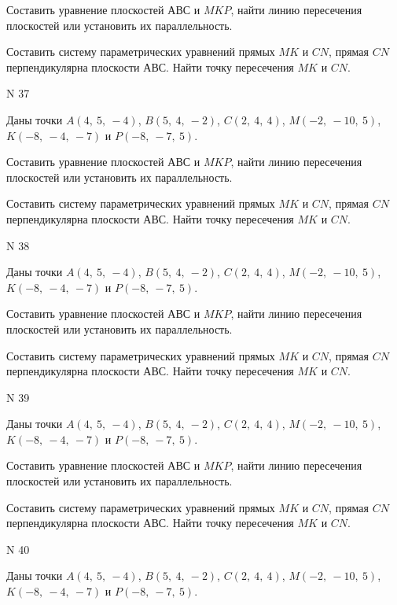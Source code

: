 \documentclass[11pt]{report}
\begin{document}
Составить уравнение плоскостей $АВС$ и $MKP$,
найти линию пересечения плоскостей или установить их параллельность.

Составить систему параметрических уравнений прямых $MK$ и $CN$,
прямая $CN$ перпендикулярна плоскости $АВС$. 
Найти точку пересечения $MK$ и $CN$.



 N 37

Даны точки $A\left( 4, \  5, \  -4\right)$, $B\left( 5, \  4, \  -2\right)$, $C\left( 2, \  4, \  4\right)$, $M\left( -2, \  -10, \  5\right)$, $K\left( -8, \  -4, \  -7\right)$ и $P\left( -8, \  -7, \  5\right)$.


Составить уравнение плоскостей $АВС$ и $MKP$,
найти линию пересечения плоскостей или установить их параллельность.

Составить систему параметрических уравнений прямых $MK$ и $CN$,
прямая $CN$ перпендикулярна плоскости $АВС$. 
Найти точку пересечения $MK$ и $CN$.



 N 38

Даны точки $A\left( 4, \  5, \  -4\right)$, $B\left( 5, \  4, \  -2\right)$, $C\left( 2, \  4, \  4\right)$, $M\left( -2, \  -10, \  5\right)$, $K\left( -8, \  -4, \  -7\right)$ и $P\left( -8, \  -7, \  5\right)$.


Составить уравнение плоскостей $АВС$ и $MKP$,
найти линию пересечения плоскостей или установить их параллельность.

Составить систему параметрических уравнений прямых $MK$ и $CN$,
прямая $CN$ перпендикулярна плоскости $АВС$. 
Найти точку пересечения $MK$ и $CN$.



 N 39

Даны точки $A\left( 4, \  5, \  -4\right)$, $B\left( 5, \  4, \  -2\right)$, $C\left( 2, \  4, \  4\right)$, $M\left( -2, \  -10, \  5\right)$, $K\left( -8, \  -4, \  -7\right)$ и $P\left( -8, \  -7, \  5\right)$.


Составить уравнение плоскостей $АВС$ и $MKP$,
найти линию пересечения плоскостей или установить их параллельность.

Составить систему параметрических уравнений прямых $MK$ и $CN$,
прямая $CN$ перпендикулярна плоскости $АВС$. 
Найти точку пересечения $MK$ и $CN$.



 N 40

Даны точки $A\left( 4, \  5, \  -4\right)$, $B\left( 5, \  4, \  -2\right)$, $C\left( 2, \  4, \  4\right)$, $M\left( -2, \  -10, \  5\right)$, $K\left( -8, \  -4, \  -7\right)$ и $P\left( -8, \  -7, \  5\right)$.
\end{document}
